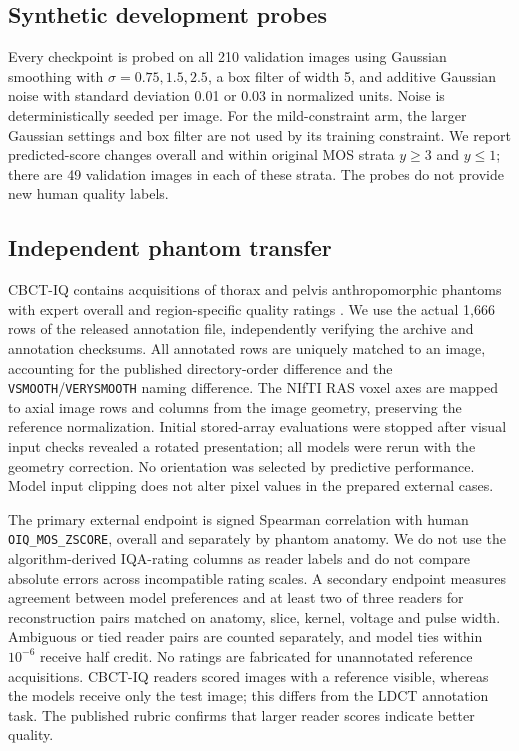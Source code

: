 \documentclass[11pt]{article}
\begin{document}
\subsection{Synthetic development probes}
Every checkpoint is probed on all 210 validation images using Gaussian smoothing with $\sigma=0.75,1.5,2.5$, a box filter of width 5, and additive Gaussian noise with standard deviation 0.01 or 0.03 in normalized units. Noise is deterministically seeded per image. For the mild-constraint arm, the larger Gaussian settings and box filter are not used by its training constraint. We report predicted-score changes overall and within original MOS strata $y\geq3$ and $y\leq1$; there are 49 validation images in each of these strata. The probes do not provide new human quality labels.

\subsection{Independent phantom transfer}
CBCT-IQ contains acquisitions of thorax and pelvis anthropomorphic phantoms with expert overall and region-specific quality ratings \cite{cbctpaper,cbctdata}. We use the actual 1,666 rows of the released annotation file, independently verifying the archive and annotation checksums. All annotated rows are uniquely matched to an image, accounting for the published directory-order difference and the \texttt{VSMOOTH}/\texttt{VERYSMOOTH} naming difference. The NIfTI RAS voxel axes are mapped to axial image rows and columns from the image geometry, preserving the reference normalization. Initial stored-array evaluations were stopped after visual input checks revealed a rotated presentation; all models were rerun with the geometry correction. No orientation was selected by predictive performance. Model input clipping does not alter pixel values in the prepared external cases.

The primary external endpoint is signed Spearman correlation with human \texttt{OIQ\_MOS\_ZSCORE}, overall and separately by phantom anatomy. We do not use the algorithm-derived IQA-rating columns as reader labels and do not compare absolute errors across incompatible rating scales. A secondary endpoint measures agreement between model preferences and at least two of three readers for reconstruction pairs matched on anatomy, slice, kernel, voltage and pulse width. Ambiguous or tied reader pairs are counted separately, and model ties within $10^{-6}$ receive half credit. No ratings are fabricated for unannotated reference acquisitions. CBCT-IQ readers scored images with a reference visible, whereas the models receive only the test image; this differs from the LDCT annotation task. The published rubric confirms that larger reader scores indicate better quality.
\end{document}
